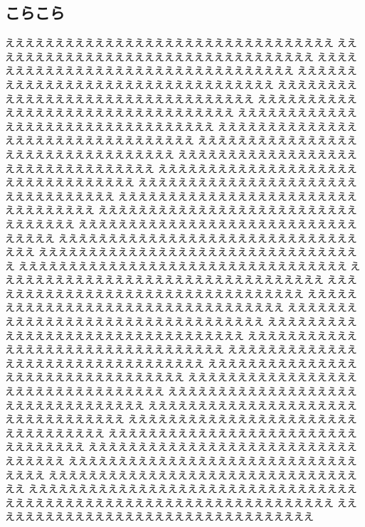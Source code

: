 \documentclass{jbook}
\begin{document}
\begin{nomarginparseprule}
\mbox{}
\section{こらこら}
\mbox{}
\end{nomarginparseprule}

えええええええええええええええええええええええええええええええええ
えええええええええええええええええええええええええええええええええ
えええええええええええええええええええええええええええええええええ
えええええええええええええええええええええええええええええええええ
えええええええええええええええええええええええええええええええええ
えええええええええええええええええええええええええええええええええ
えええええええええええええええええええええええええええええええええ
えええええええええええええええええええええええええええええええええ
えええええええええええええええええええええええええええええええええ
えええええええええええええええええええええええええええええええええ
えええええええええええええええええええええええええええええええええ
えええええええええええええええええええええええええええええええええ
えええええええええええええええええええええええええええええええええ
えええええええええええええええええええええええええええええええええ
えええええええええええええええええええええええええええええええええ
えええええええええええええええええええええええええええええええええ
えええええええええええええええええええええええええええええええええ
えええええええええええええええええええええええええええええええええ
えええええええええええええええええええええええええええええええええ
えええええええええええええええええええええええええええええええええ
えええええええええええええええええええええええええええええええええ
えええええええええええええええええええええええええええええええええ
えええええええええええええええええええええええええええええええええ
えええええええええええええええええええええええええええええええええ
えええええええええええええええええええええええええええええええええ
えええええええええええええええええええええええええええええええええ
えええええええええええええええええええええええええええええええええ
えええええええええええええええええええええええええええええええええ
えええええええええええええええええええええええええええええええええ
えええええええええええええええええええええええええええええええええ
えええええええええええええええええええええええええええええええええ
えええええええええええええええええええええええええええええええええ
えええええええええええええええええええええええええええええええええ
えええええええええええええええええええええええええええええええええ
えええええええええええええええええええええええええええええええええ
えええええええええええええええええええええええええええええええええ
えええええええええええええええええええええええええええええええええ
\end{document}
